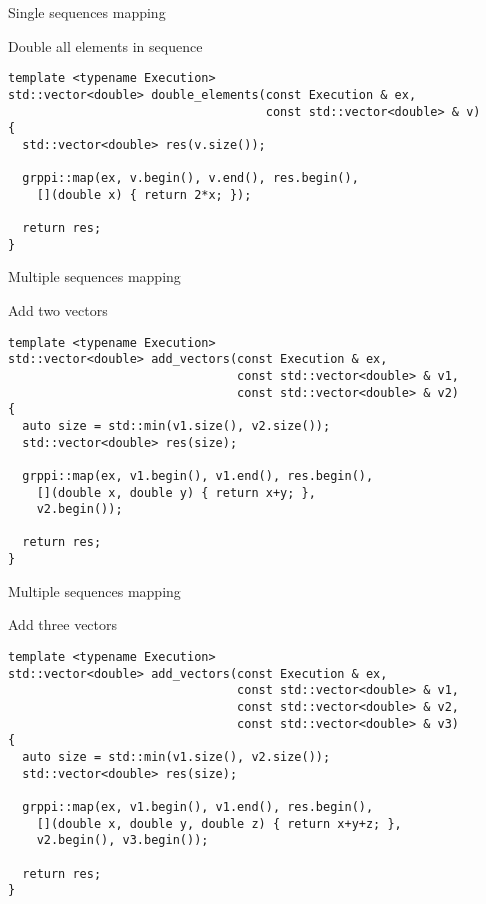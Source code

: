 \begin{frame}[t,fragile]{Single sequences mapping}
\begin{block}{Double all elements in sequence}
\begin{lstlisting}
template <typename Execution>
std::vector<double> double_elements(const Execution & ex, 
                                    const std::vector<double> & v) 
{
  std::vector<double> res(v.size());

  grppi::map(ex, v.begin(), v.end(), res.begin(), 
    [](double x) { return 2*x; });

  return res;
}
\end{lstlisting}
\end{block}
\end{frame}

\begin{frame}[t,fragile]{Multiple sequences mapping}
\begin{block}{Add two vectors}
\begin{lstlisting}
template <typename Execution>
std::vector<double> add_vectors(const Execution & ex, 
                                const std::vector<double> & v1,
                                const std::vector<double> & v2) 
{
  auto size = std::min(v1.size(), v2.size());
  std::vector<double> res(size);

  grppi::map(ex, v1.begin(), v1.end(), res.begin(),
    [](double x, double y) { return x+y; },
    v2.begin());

  return res;
}
\end{lstlisting}
\end{block}
\end{frame}

\begin{frame}[t,fragile]{Multiple sequences mapping}
\begin{block}{Add three vectors}
\begin{lstlisting}
template <typename Execution>
std::vector<double> add_vectors(const Execution & ex, 
                                const std::vector<double> & v1,
                                const std::vector<double> & v2,
                                const std::vector<double> & v3) 
{
  auto size = std::min(v1.size(), v2.size());
  std::vector<double> res(size);

  grppi::map(ex, v1.begin(), v1.end(), res.begin(),
    [](double x, double y, double z) { return x+y+z; },
    v2.begin(), v3.begin());

  return res;
}
\end{lstlisting}
\end{block}
\end{frame}

